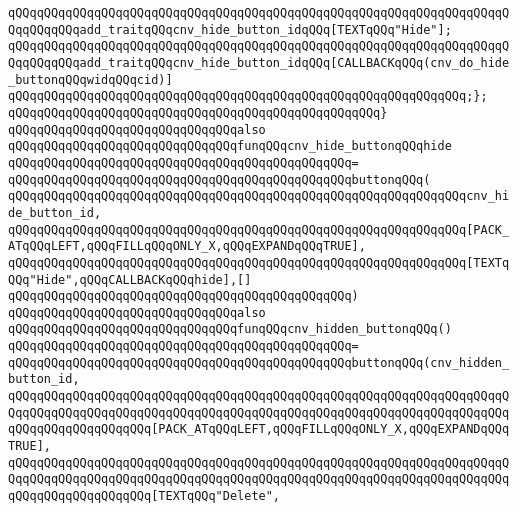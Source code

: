 \verb|qQQqqQQqqQQqqQQqqQQqqQQqqQQqqQQqqQQqqQQqqQQqqQQqqQQqqQQqqQQqqQQqqQQqqQQqqQQqqQQqadd_traitqQQqcnv_hide_button_idqQQq[TEXTqQQq"Hide"];|\newline
\verb|qQQqqQQqqQQqqQQqqQQqqQQqqQQqqQQqqQQqqQQqqQQqqQQqqQQqqQQqqQQqqQQqqQQqqQQqqQQqqQQqadd_traitqQQqcnv_hide_button_idqQQq[CALLBACKqQQq(cnv_do_hide_buttonqQQqwidqQQqcid)]|\newline
\verb|qQQqqQQqqQQqqQQqqQQqqQQqqQQqqQQqqQQqqQQqqQQqqQQqqQQqqQQqqQQqqQQq;};|\newline
\verb|qQQqqQQqqQQqqQQqqQQqqQQqqQQqqQQqqQQqqQQqqQQqqQQqqQQq}|\newline
\newline
\verb|qQQqqQQqqQQqqQQqqQQqqQQqqQQqqQQqalso|\newline
\verb|qQQqqQQqqQQqqQQqqQQqqQQqqQQqqQQqfunqQQqcnv_hide_buttonqQQqhide|\newline
\verb|qQQqqQQqqQQqqQQqqQQqqQQqqQQqqQQqqQQqqQQqqQQqqQQq=|\newline
\verb|qQQqqQQqqQQqqQQqqQQqqQQqqQQqqQQqqQQqqQQqqQQqqQQqbuttonqQQq(|\newline
\verb|qQQqqQQqqQQqqQQqqQQqqQQqqQQqqQQqqQQqqQQqqQQqqQQqqQQqqQQqqQQqqQQqcnv_hide_button_id,|\newline
\verb|qQQqqQQqqQQqqQQqqQQqqQQqqQQqqQQqqQQqqQQqqQQqqQQqqQQqqQQqqQQqqQQq[PACK_ATqQQqLEFT,qQQqFILLqQQqONLY_X,qQQqEXPANDqQQqTRUE],|\newline
\verb|qQQqqQQqqQQqqQQqqQQqqQQqqQQqqQQqqQQqqQQqqQQqqQQqqQQqqQQqqQQqqQQq[TEXTqQQq"Hide",qQQqCALLBACKqQQqhide],[]|\newline
\verb|qQQqqQQqqQQqqQQqqQQqqQQqqQQqqQQqqQQqqQQqqQQqqQQq)|\newline
\newline
\verb|qQQqqQQqqQQqqQQqqQQqqQQqqQQqqQQqalso|\newline
\verb|qQQqqQQqqQQqqQQqqQQqqQQqqQQqqQQqfunqQQqcnv_hidden_buttonqQQq()|\newline
\verb|qQQqqQQqqQQqqQQqqQQqqQQqqQQqqQQqqQQqqQQqqQQqqQQq=|\newline
\verb|qQQqqQQqqQQqqQQqqQQqqQQqqQQqqQQqqQQqqQQqqQQqqQQqbuttonqQQq(cnv_hidden_button_id,|\newline
\verb|qQQqqQQqqQQqqQQqqQQqqQQqqQQqqQQqqQQqqQQqqQQqqQQqqQQqqQQqqQQqqQQqqQQqqQQqqQQqqQQqqQQqqQQqqQQqqQQqqQQqqQQqqQQqqQQqqQQqqQQqqQQqqQQqqQQqqQQqqQQqqQQqqQQqqQQqqQQqqQQq[PACK_ATqQQqLEFT,qQQqFILLqQQqONLY_X,qQQqEXPANDqQQqTRUE],|\newline
\verb|qQQqqQQqqQQqqQQqqQQqqQQqqQQqqQQqqQQqqQQqqQQqqQQqqQQqqQQqqQQqqQQqqQQqqQQqqQQqqQQqqQQqqQQqqQQqqQQqqQQqqQQqqQQqqQQqqQQqqQQqqQQqqQQqqQQqqQQqqQQqqQQqqQQqqQQqqQQqqQQq[TEXTqQQq"Delete",|\newline
